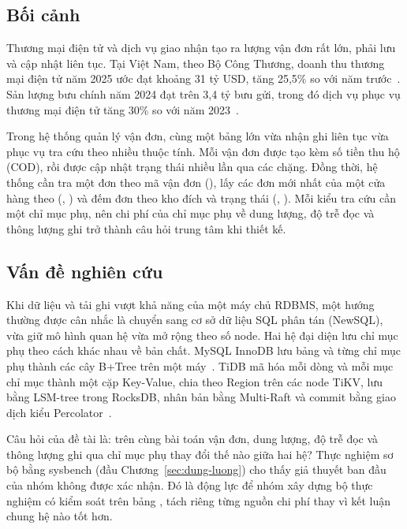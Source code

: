 
\subsection{Bối cảnh}
Thương mại điện tử và dịch vụ giao nhận tạo ra lượng vận đơn rất lớn, phải lưu và cập nhật liên tục. Tại Việt Nam, theo Bộ Công Thương, doanh thu thương mại điện tử năm 2025 ước đạt khoảng 31 tỷ USD, tăng 25,5\% so với năm trước~\cite{vn_ecommerce_2025}. Sản lượng bưu chính năm 2024 đạt trên 3,4 tỷ bưu gửi, trong đó dịch vụ phục vụ thương mại điện tử tăng 30\% so với năm 2023~\cite{vn_buu_chinh_2024}.

Trong hệ thống quản lý vận đơn, cùng một bảng lớn vừa nhận ghi liên tục vừa phục vụ tra cứu theo nhiều thuộc tính. Mỗi vận đơn được tạo kèm số tiền thu hộ (COD), rồi được cập nhật trạng thái nhiều lần qua các chặng. Đồng thời, hệ thống cần tra một đơn theo mã vận đơn (), lấy các đơn mới nhất của một cửa hàng theo (, ) và đếm đơn theo kho đích và trạng thái (, ). Mỗi kiểu tra cứu cần một chỉ mục phụ, nên chi phí của chỉ mục phụ về dung lượng, độ trễ đọc và thông lượng ghi trở thành câu hỏi trung tâm khi thiết kế.

\subsection{Vấn đề nghiên cứu}
Khi dữ liệu và tải ghi vượt khả năng của một máy chủ RDBMS, một hướng thường được cân nhắc là chuyển sang cơ sở dữ liệu SQL phân tán (NewSQL), vừa giữ mô hình quan hệ vừa mở rộng theo số node. Hai hệ đại diện lưu chỉ mục phụ theo cách khác nhau về bản chất. MySQL InnoDB lưu bảng và từng chỉ mục phụ thành các cây B+Tree trên một máy~\cite{mysql_innodb}. TiDB mã hóa mỗi dòng và mỗi mục chỉ mục thành một cặp Key-Value, chia theo Region trên các node TiKV, lưu bằng LSM-tree trong RocksDB, nhân bản bằng Multi-Raft và commit bằng giao dịch kiểu Percolator~\cite{pingcap_mapping,percolator}.

Câu hỏi của đề tài là: trên cùng bài toán vận đơn, dung lượng, độ trễ đọc và thông lượng ghi qua chỉ mục phụ thay đổi thế nào giữa hai hệ? Thực nghiệm sơ bộ bằng sysbench (đầu Chương~\ref{sec:dung-luong}) cho thấy giả thuyết ban đầu của nhóm không được xác nhận. Đó là động lực để nhóm xây dựng bộ thực nghiệm có kiểm soát trên bảng , tách riêng từng nguồn chi phí thay vì kết luận chung hệ nào tốt hơn.

